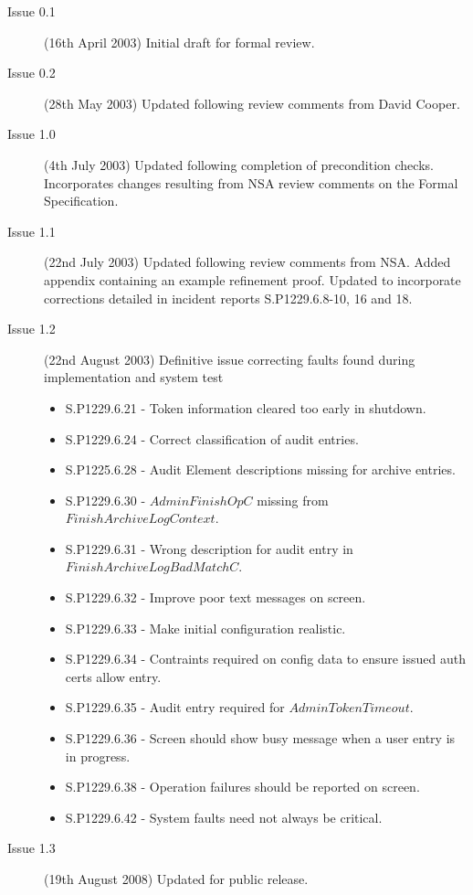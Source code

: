 \documentclass{pxcsdoc}
\begin{document}
\begin{description}
\item [Issue 0.1] 
(16th April 2003) Initial draft for formal review.
\item [Issue 0.2]
(28th May 2003) Updated following review comments from David Cooper.
\item [Issue 1.0]
(4th July 2003) Updated following completion of precondition
checks. Incorporates changes resulting from NSA review comments on the
Formal Specification.
\item [Issue 1.1]
(22nd July 2003) Updated following review comments from
NSA. Added appendix containing an example refinement proof. 
Updated to incorporate corrections detailed in incident reports
S.P1229.6.8-10, 16 and 18.
\item [Issue 1.2]
(22nd August 2003) 
Definitive issue correcting faults found during implementation and
system test
\begin{itemize}
\item
S.P1229.6.21 - Token information cleared too early in shutdown.
\item 
S.P1229.6.24 - Correct classification of audit entries.
\item
S.P1225.6.28 - Audit Element descriptions missing for archive entries.
\item
S.P1229.6.30 - $AdminFinishOpC$ missing from $FinishArchiveLogContext$.
\item
S.P1229.6.31 - Wrong description for audit entry in $FinishArchiveLogBadMatchC$.
\item
S.P1229.6.32 - Improve poor text messages on screen.
\item
S.P1229.6.33 - Make initial configuration realistic.
\item
S.P1229.6.34 - Contraints required on config data to ensure issued
auth certs allow entry.
\item
S.P1229.6.35 - Audit entry required for $AdminTokenTimeout$.
\item
S.P1229.6.36 - Screen should show busy message when a user entry is in progress.
\item
S.P1229.6.38 - Operation failures should be reported on screen.
\item
S.P1229.6.42 - System faults need not always be critical.
\end{itemize}
\item [Issue 1.3]
(19th August 2008) Updated for public release.
\end{description}
\end{document}
